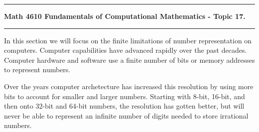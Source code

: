 \documentclass[10pt,fleqn]{article}
\begin{document}
\vskip0.1in\hrule\vskip0.1in \noindent
{\bf Math 4610 Fundamentals of Computational Mathematics  - Topic 17.}
\vskip0.1in\hrule\vskip0.1in \noindent
In this section we will focus on the finite limitations of number representation
on computers. Computer capabilities have advanced rapidly over the past decades.
Computer hardware and software use a finite number of bits or memory addresses
to represent numbers.

Over the years computer archetecture has increased this resolution by using more
bits
to account for smaller and larger numbers. Starting with 8-bit, 16-bit, and then
onto 32-bit and 64-bit numbers, the resolution has gotten better, but will never
be able to represent an infinite number of digits needed to store irrational
numbers.
\end{document}
